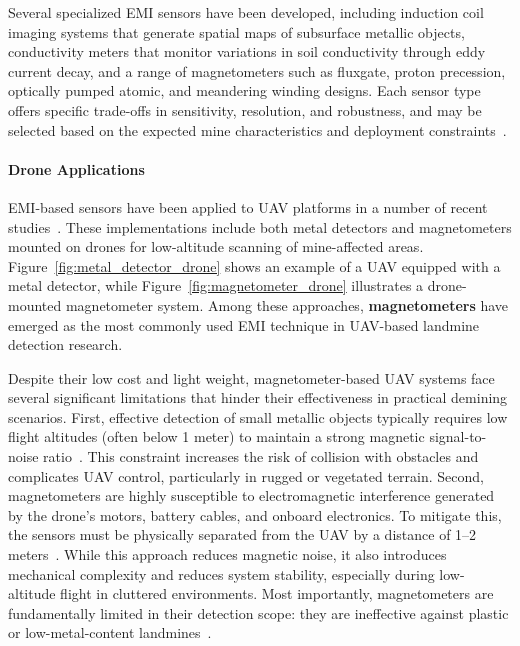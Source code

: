 Several specialized \gls{EMI} sensors have been developed, including induction coil imaging systems that generate spatial maps of subsurface metallic objects, conductivity meters that monitor variations in soil conductivity through eddy current decay, and a range of magnetometers such as fluxgate, proton precession, optically pumped atomic, and meandering winding designs. Each sensor type offers specific trade-offs in sensitivity, resolution, and robustness, and may be selected based on the expected mine characteristics and deployment constraints~\cite{Gooneratne2004ARO, Bruschini1997ASO}.

\paragraph{Drone Applications} \gls{EMI}-based sensors have been applied to \gls{UAV} platforms in a number of recent studies~\cite{yoo2020drone,yoo2021application,rs16162916,Yoo2024UnmannedAV}. These implementations include both metal detectors and magnetometers mounted on drones for low-altitude scanning of mine-affected areas. Figure~\ref{fig:metal_detector_drone} shows an example of a \gls{UAV} equipped with a metal detector, while Figure~\ref{fig:magnetometer_drone} illustrates a drone-mounted magnetometer system. Among these approaches, \textbf{magnetometers} have emerged as the most commonly used \gls{EMI} technique in \gls{UAV}-based landmine detection research.

Despite their low cost and light weight, magnetometer-based \gls{UAV} systems face several significant limitations that hinder their effectiveness in practical demining scenarios. First, effective detection of small metallic objects typically requires low flight altitudes (often below 1 meter) to maintain a strong magnetic signal-to-noise ratio~\cite{yoo2020drone,Yoo2024UnmannedAV}. This constraint increases the risk of collision with obstacles and complicates \gls{UAV} control, particularly in rugged or vegetated terrain. Second, magnetometers are highly susceptible to electromagnetic interference generated by the drone’s motors, battery cables, and onboard electronics. To mitigate this, the sensors must be physically separated from the \gls{UAV} by a distance of 1--2 meters~\cite{Yoo2024UnmannedAV,rs16162916}. While this approach reduces magnetic noise, it also introduces mechanical complexity and reduces system stability, especially during low-altitude flight in cluttered environments. Most importantly, magnetometers are fundamentally limited in their detection scope: they are ineffective against plastic or low-metal-content landmines~\cite{garcia2020airborne,vsipovs2020lightweight}.

